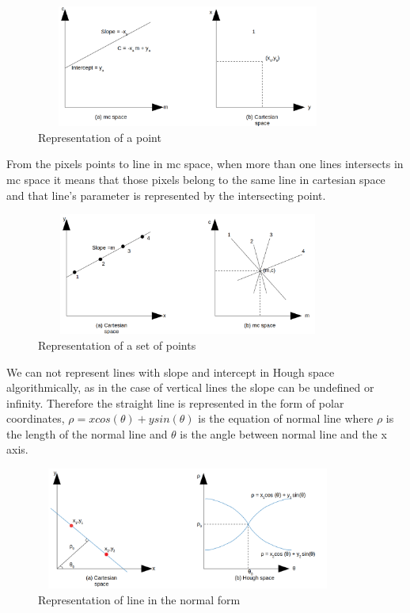                     \begin{figure}[h]
    \centering
    \includegraphics[width=10cm, height =4cm]{images/hough2.png}
    \caption{Representation of a point}
    \end{figure}
    
    From the pixels points to line in mc space, when more than one lines intersects in mc space it means that those pixels belong to the same line in cartesian space and that line's parameter is represented by the intersecting point. 
    
                 \begin{figure}[h]
    \centering
    \includegraphics[width=10cm, height =4cm]{images/hough3.png}
    \caption{Representation of a set of points}
    \end{figure}
    
    We can not represent lines with slope and intercept in Hough space algorithmically, as in the case of vertical lines the slope can be undefined or infinity. Therefore the straight line is represented in the form of polar coordinates, $\rho = xcos(\theta) + ysin(\theta) $ is the equation of normal line where $\rho$ is the length of the normal line and $\theta$ is the angle between normal line and the x axis. 
    
    \begin{figure}[h]
    \centering
    \includegraphics[width=10cm, height =4cm]{images/hough4.png}
    \caption{Representation of line in the normal form}
    \end{figure}
    
